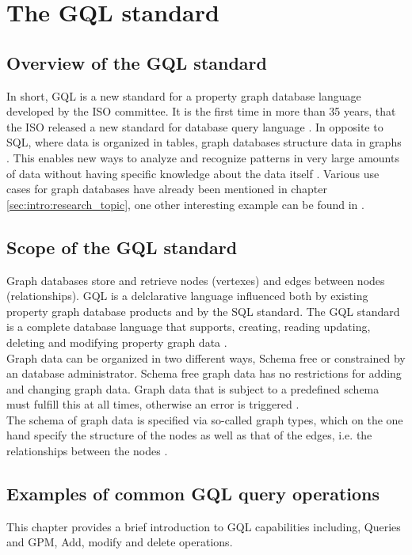 \chapter{The GQL standard}
\label{ch:iso}
\section{Overview of the GQL standard}
\label{sec:iso:overview}
In short, GQL is a new standard for a property graph database language developed by 
the ISO committee.
It is the first time in more than 35 years, that the ISO released a new 
standard for database query language \citep{hare_isoiec_2024}.
In opposite to SQL, where data is organized in tables, graph databases structure data in graphs . 
This enables new ways to analyze and recognize patterns in very large amounts of 
data without having specific knowledge about the data itself \citep{PINO2024100997}.
Various use cases for graph databases have already been mentioned in chapter \ref{sec:intro:research_topic}, 
one other interesting example can be found in \citep{SAAD2023136344}.

\section{Scope of the GQL standard}
\label{sec:iso:scope}
Graph databases store and retrieve nodes (vertexes) and
edges between nodes (relationships). GQL is a delclarative language influenced both by 
existing property graph database products and by the SQL standard.
The GQL standard is a complete database language that supports, creating, reading
updating, deleting and modifying property graph data \citep{hare_isoiec_2024}. \\
Graph data can be organized in two different ways, Schema free or constrained by an database administrator.
Schema free graph data has no restrictions for adding and changing graph data.
Graph data that is subject to a predefined schema must fulfill this at all times, 
otherwise an error is triggered \citep{WIHARJA2020100616}.\\
The schema of graph data is specified via so-called graph types, 
which on the one hand specify the structure of the nodes as well as that of the edges, 
i.e. the relationships between the nodes \citep{hare_isoiec_2024}.

\section{Examples of common GQL query operations}
\label{sec:iso:examples}
This chapter provides a brief introduction to GQL capabilities including, 
Queries and \ac{GPM}, Add, modify and delete operations.

